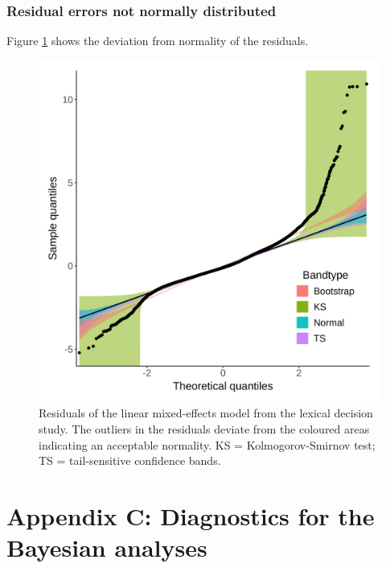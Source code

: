 \documentclass[
  12pt,
  man,floatsintext]{apa7}
\begin{document}
\hypertarget{residual-errors-not-normally-distributed-4}{%
\subsubsection{Residual errors not normally distributed}\label{residual-errors-not-normally-distributed-4}}

Figure \ref{fig:lexicaldecision-residuals} shows the deviation from normality of the residuals.

\begin{figure}

{\centering \includegraphics[width=0.65\linewidth]{../lexicaldecision/frequentist_analysis/model_diagnostics/plots/lexicaldecision_residuals} 

}

\caption{Residuals of the linear mixed-effects model from the lexical decision study. The outliers in the residuals deviate from the coloured areas indicating an acceptable normality. \linebreak KS = Kolmogorov-Smirnov test; TS = tail-sensitive confidence bands.}\label{fig:lexicaldecision-residuals}
\end{figure}

\clearpage

\renewcommand{\thefigure}{C\arabic{figure}} \setcounter{figure}{0}
\renewcommand{\thetable}{C\arabic{table}} \setcounter{table}{0}

\hypertarget{appendix-C-Bayesian-analysis-diagnostics}{%
\section{Appendix C: Diagnostics for the Bayesian analyses}\label{appendix-C-Bayesian-analysis-diagnostics}}
\end{document}
